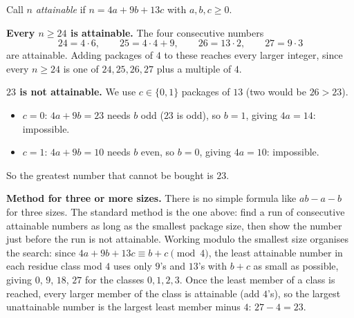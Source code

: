 Call $n$ \emph{attainable} if $n=4a+9b+13c$ with $a,b,c\ge0$.

\textbf{Every $n\ge24$ is attainable.} The four consecutive numbers
\[24=4\cdot6,\qquad 25=4\cdot4+9,\qquad 26=13\cdot2,\qquad 27=9\cdot3\]
are attainable. Adding packages of $4$ to these reaches every larger integer, since every $n\ge24$ is one of $24,25,26,27$ plus a multiple of $4$.

\textbf{$23$ is not attainable.} We use $c\in\{0,1\}$ packages of $13$ (two would be $26>23$).
\begin{itemize}
\item $c=0$: $4a+9b=23$ needs $b$ odd ($23$ is odd), so $b=1$, giving $4a=14$: impossible.
\item $c=1$: $4a+9b=10$ needs $b$ even, so $b=0$, giving $4a=10$: impossible.
\end{itemize}
So the greatest number that cannot be bought is $\boxed{23}$.

\textbf{Method for three or more sizes.} There is no simple formula like $ab-a-b$ for three sizes. The standard method is the one above: find a run of consecutive attainable numbers as long as the smallest package size, then show the number just before the run is not attainable. Working modulo the smallest size organises the search: since $4a+9b+13c\equiv b+c\pmod4$, the least attainable number in each residue class mod $4$ uses only $9$'s and $13$'s with $b+c$ as small as possible, giving $0$, $9$, $18$, $27$ for the classes $0,1,2,3$. Once the least member of a class is reached, every larger member of the class is attainable (add $4$'s), so the largest unattainable number is the largest least member minus $4$: $27-4=23$.
